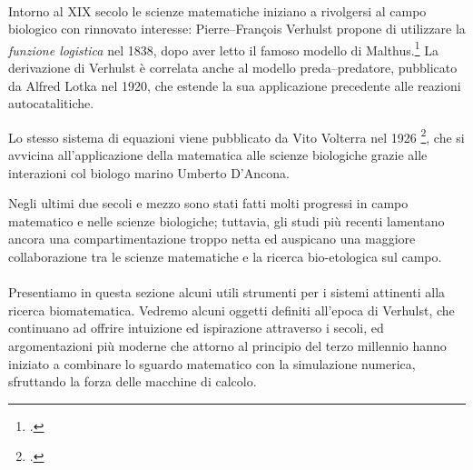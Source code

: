 \paragraph{}
Intorno al XIX secolo le scienze matematiche iniziano a rivolgersi al campo biologico con rinnovato interesse:
Pierre--François Verhulst propone di utilizzare la \emph{funzione logistica} nel 1838, dopo aver letto il famoso
modello di Malthus.\footcite{malthus1986essay}
La derivazione di Verhulst è correlata anche al modello preda--predatore, pubblicato da Alfred
Lotka nel 1920, che estende la sua applicazione precedente alle reazioni autocatalitiche.

Lo stesso sistema di equazioni viene pubblicato da Vito Volterra nel 1926
\footcite{vito},
che si avvicina all'applicazione della matematica alle scienze biologiche grazie alle interazioni col
biologo marino Umberto D'Ancona.

Negli ultimi due secoli e mezzo sono stati fatti molti progressi in campo matematico e nelle scienze biologiche;
tuttavia, gli studi più recenti lamentano ancora una compartimentazione troppo netta ed auspicano una maggiore
collaborazione tra le scienze matematiche e la ricerca bio-etologica sul campo.

\paragraph{}
Presentiamo in questa sezione alcuni utili strumenti per i sistemi attinenti alla ricerca biomatematica.
Vedremo alcuni oggetti definiti all'epoca di Verhulst, che continuano ad offrire intuizione ed ispirazione
attraverso i secoli, ed argomentazioni più moderne che attorno al principio del terzo millennio hanno iniziato
a combinare lo sguardo matematico con la simulazione numerica, sfruttando la forza delle macchine di calcolo.



